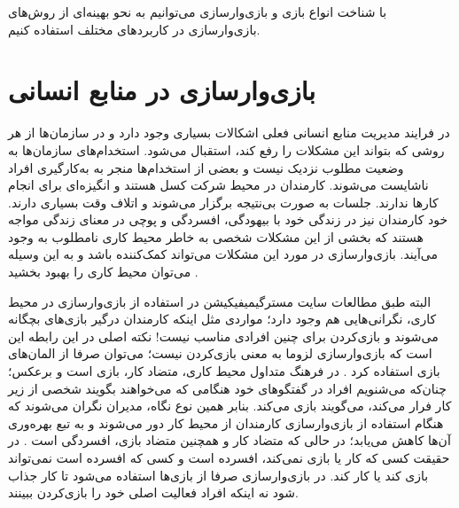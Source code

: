 با شناخت انواع بازی و بازی‌وارسازی می‌توانیم به نحو بهینه‌ای از روش‌های بازی‌وارسازی در کاربردهای مختلف استفاده کنیم.

\section{بازی‌وارسازی در منابع انسانی}
در فرایند مدیریت منابع انسانی فعلی اشکالات بسیاری وجود دارد و در سازمان‌ها از هر روشی که بتواند این مشکلات را رفع کند، استقبال می‌شود. استخدام‌های سازمان‌ها به وضعیت مطلوب نزدیک نیست و بعضی از استخدام‌ها منجر به به‌کارگیری افراد ناشایست می‌شوند. کارمندان در محیط شرکت کسل هستند و انگیزه‌ای برای انجام کارها ندارند. جلسات به صورت بی‌نتیجه برگزار می‌شوند و اتلاف وقت بسیاری دارند. خود کارمندان نیز در زندگی خود با بیهودگی، افسردگی و پوچی در معنای زندگی مواجه هستند که بخشی از این مشکلات شخصی به خاطر محیط کاری نامطلوب به وجود می‌آیند. بازی‌وارسازی در مورد این مشکلات می‌تواند کمک‌کننده باشد و به این وسیله می‌توان محیط کاری را بهبود بخشید \cite{boudlaie}.

البته طبق مطالعات سایت مسترگیمیفیکیشن \cite{scenarios} در استفاده از بازی‌وارسازی در محیط کاری، نگرانی‌هایی هم وجود دارد؛ مواردی مثل اینکه کارمندان درگیر بازی‌های بچگانه می‌شوند و بازی‌کردن برای چنین افرادی مناسب نیست! نکته اصلی در این رابطه این است که بازی‌وارسازی لزوما به معنی بازی‌کردن نیست؛ می‌توان صرفا از المان‌های بازی استفاده کرد \cite{poliver}. در فرهنگ متداول محیط کاری، متضاد کار، بازی است و برعکس؛ چنان‌که می‌شنویم افراد در گفتگوهای خود هنگامی که می‌خواهند بگویند شخصی از زیر کار فرار می‌کند، می‌گویند بازی می‌کند. بنابر همین نوع نگاه، مدیران نگران می‌شوند که هنگام استفاده از بازی‌وارسازی کارمندان از محیط کار دور می‌شوند و به تبع بهره‌وری آن‌ها کاهش می‌یابد؛ در حالی که متضاد کار و همچنین متضاد بازی، افسردگی است \cite{tedx}. در حقیقت کسی که کار یا بازی نمی‌کند، افسرده است و کسی که افسرده است نمی‌تواند بازی کند یا کار کند. در بازی‌وارسازی صرفا از بازی‌ها استفاده می‌شود تا کار جذاب شود نه اینکه افراد فعالیت اصلی خود را بازی‌کردن ببینند.

